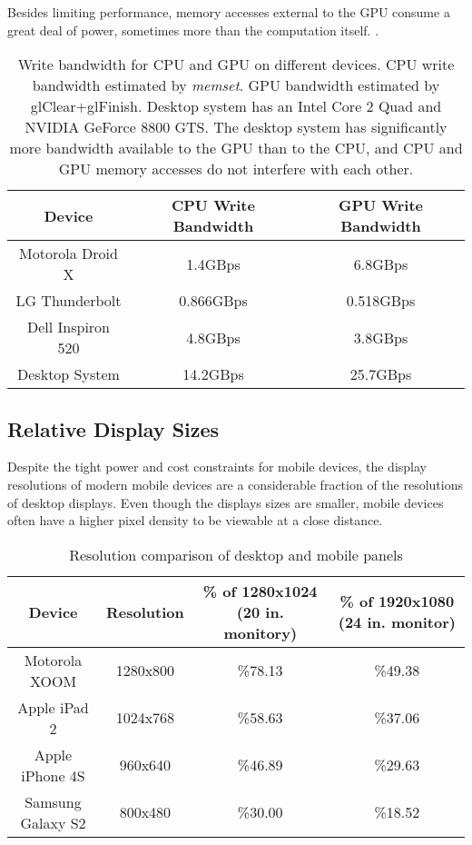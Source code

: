 Besides limiting performance, memory accesses external to the GPU consume a
great deal of power, sometimes more than the computation itself.
\cite{Antochi04}.

\begin{table}[htb]\centering \begin{tabular}{|c|c|c|} 
\hline \small{Device} & \small{CPU Write Bandwidth} & \small{GPU Write Bandwidth}   \\ \hline 
\hline \small{Motorola Droid X} & \small{1.4GBps} & \small{6.8GBps} \\ 
\hline \small{LG Thunderbolt} & \small{0.866GBps} & \small{0.518GBps} \\ 
\hline \small{Dell Inspiron 520} & \small{4.8GBps} & \small{3.8GBps} \\ 
\hline \small{Desktop System} & \small{14.2GBps} & \small{25.7GBps}\\
\hline
\end{tabular} 
\caption{Write bandwidth for CPU and GPU on different devices.  CPU write bandwidth estimated by \textit{memset}.  GPU bandwidth estimated by glClear+glFinish.  Desktop system has an Intel Core 2 Quad and NVIDIA GeForce 8800 GTS.  The desktop system has significantly more bandwidth available to the GPU than to the CPU, and CPU and GPU memory accesses do not interfere with each other.}
\label{JonMcCaffrey:bandwidth} \end{table}

\subsection{Relative Display Sizes}\label{Jon-McCaffrey:relative-display-sizes}

 

Despite the tight power and cost constraints for mobile devices, the display
resolutions of modern mobile devices are a considerable fraction of the
resolutions of desktop displays.  Even though the displays sizes are smaller,
mobile devices often have a higher pixel density to be viewable at a close
distance.

\begin{table}[htb]\centering \begin{tabular}{|c|c|c|c|} 
\hline \small{Device} & \small{Resolution} & \small{\% of 1280x1024 (20 in. monitory)} & \small{\% of 1920x1080 (24 in. monitor)}  \\ \hline 
\small{Motorola XOOM} & \small{1280x800} & \small{\%78.13} & \small{\%49.38}\\ 
\hline \small{Apple iPad 2} & \small{1024x768} & \small{\%58.63} & \small{\%37.06}\\ 
\hline \small{Apple iPhone 4S} & \small{960x640} & \small{\%46.89} & \small{\%29.63}\\
\hline \small{Samsung Galaxy S2} & \small{800x480} & \small{\%30.00} & \small{\%18.52}\\ \hline
\end{tabular} 
\caption{Resolution comparison of desktop and mobile panels} 
\label{JonMcCaffrey:resolutions} \end{table}

